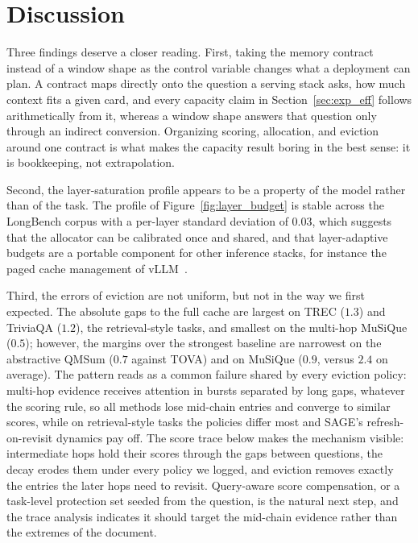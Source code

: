 \section{Discussion}\label{sec:discussion}

Three findings deserve a closer reading. First, taking the memory
contract instead of a window shape as the control variable changes
what a deployment can plan. A contract maps directly onto the question
a serving stack asks, how much context fits a given card, and every
capacity claim in Section~\ref{sec:exp_eff} follows arithmetically
from it, whereas a window shape answers that question only through an
indirect conversion. Organizing scoring, allocation, and eviction
around one contract is what makes the capacity result boring in the
best sense: it is bookkeeping, not extrapolation.

Second, the layer-saturation profile appears to be a property of the
model rather than of the task. The profile of
Figure~\ref{fig:layer_budget} is stable across the LongBench corpus
with a per-layer standard deviation of $0.03$, which suggests that the
allocator can be calibrated once and shared, and that layer-adaptive
budgets are a portable component for other inference stacks, for
instance the paged cache management of vLLM~\cite{kwon2023vllm}.

Third, the errors of eviction are not uniform, but not in the way we
first expected. The absolute gaps to the full cache are largest on
TREC ($1.3$) and TriviaQA ($1.2$), the retrieval-style tasks, and
smallest on the multi-hop MuSiQue ($0.5$); however, the margins over
the strongest baseline are narrowest on the abstractive QMSum ($0.7$
against TOVA) and on MuSiQue ($0.9$, versus $2.4$ on average). The pattern reads as a common failure
shared by every eviction policy: multi-hop evidence receives attention
in bursts separated by long gaps, whatever the scoring rule, so all
methods lose mid-chain entries and converge to similar scores, while
on retrieval-style tasks the policies differ most and SAGE's
refresh-on-revisit dynamics pay off. The score trace below makes the
mechanism visible: intermediate hops hold their scores through the
gaps between questions, the decay erodes them under every policy we
logged, and eviction removes exactly the entries the later hops need
to revisit. Query-aware score compensation, or a task-level protection
set seeded from the question, is the natural next step, and the trace
analysis indicates it should target the mid-chain evidence rather
than the extremes of the document.

